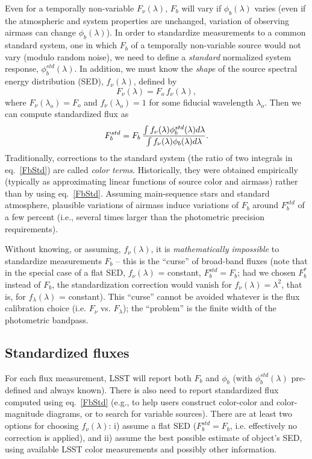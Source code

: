 \documentclass[DM,toc]{lsstdoc}
\begin{document}
Even for a temporally non-variable $F_\nu(\lambda)$,  $F_b$ will vary if
$\phi_b(\lambda)$ varies (even if the atmospheric and system properties
are unchanged, variation of observing airmass can change $\phi_b(\lambda)$).
In order to standardize measurements to a
common standard system, one in which $F_b$ of a temporally non-variable
source would not vary (modulo random noise),  we need to define a \textit{standard}
normalized system response, $\phi^{std}_b(\lambda)$. In addition, we must know the \textit{shape}
of the source spectral energy distribution (SED), $f_\nu(\lambda)$, defined by
\begin{equation}
        F_\nu(\lambda) = F_o \, f_\nu(\lambda),
\end{equation}
where $F_\nu(\lambda_o) = F_o$ and $f_\nu(\lambda_o) = 1$ for some fiducial
wavelength $\lambda_o$. Then we can compute standardized flux as
\begin{equation}
\label{FbStd}
F^{std}_b =  F_b \, {\int{f_\nu(\lambda)  \phi^{std}_b(\lambda) d\lambda }  \over   \int{ f_\nu(\lambda) \phi_b(\lambda) d\lambda }}.
\end{equation}
Traditionally, corrections to the standard system (the ratio of two integrals in eq.~\ref{FbStd})
are called \textit{color terms}. Historically, they were obtained empirically (typically as approximating
linear functions of source color and airmass) rather than by using eq.~\ref{FbStd}. Assuming
main-sequence stars and standard atmosphere, plausible variations of airmass induce variations
of $F_b$ around $F^{std}_b$ of a few percent (i.e., several times larger than the photometric
precision requirements).

Without knowing, or assuming, $f_\nu(\lambda)$, it is \textit{mathematically impossible}  to
standardize measurements $F_b$ -- this is the ``curse'' of broad-band fluxes
(note that in the special case of a flat SED, $f_\nu(\lambda)$ = constant, $F^{std}_b =  F_b$;
had we chosen $F_b^\ast$ instead of $F_b$, the standardization correction would vanish for
$f_\nu(\lambda) = \lambda^2$, that is, for $f_\lambda(\lambda)$ = constant).
This ``curse'' cannot be avoided whatever is the flux calibration choice (i.e. $F_\nu$ vs. $F_\lambda$);
the ``problem'' is the finite width of the photometric bandpass.


\subsection{Standardized fluxes}

For each flux measurement, LSST will report both $F_b$ and $\phi_b$ (with $\phi^{std}_b(\lambda)$
pre-defined and always known). There is also need to report standardized flux
computed using eq.~\ref{FbStd} (e.g., to help users construct color-color and color-magnitude
diagrams, or to search for variable sources). There are at least two options for choosing $f_\nu(\lambda)$:
i) assume a flat SED ($F^{std}_b =  F_b$, i.e. effectively no correction is applied), and ii) assume
the best possible estimate of object's SED, using available LSST color measurements and possibly
other information.
\end{document}
